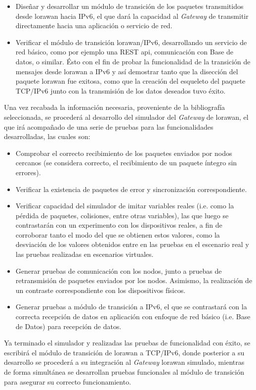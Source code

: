 \begin{justify}
\begin{itemize}
\item Diseñar y desarrollar un módulo de transición de los paquetes transmitidos desde \gls{lorawan} hacia IPv6, el que dará la capacidad al \textit{Gateway} de transmitir directamente hacia una aplicación o servicio de red.
\item Verificar el módulo de transición \gls{lorawan}/IPv6, desarrollando un servicio de red básico, como por ejemplo una REST \gls{api}, comunicación con Base de datos, o similar. Ésto con el fin de probar la funcionalidad de la transición de mensajes desde \gls{lorawan} a IPv6 y así demostrar tanto que la disección del paquete \gls{lorawan} fue exitosa, como que la creación del esqueleto del paquete TCP/IPv6 junto con la transmisión de los datos deseados tuvo éxito.
\end{itemize}

Una vez recabada la información necesaria, proveniente de la bibliografía seleccionada, se procederá al desarrollo del simulador del \textit{Gateway} de \gls{lorawan}, el que irá acompañado de una serie de pruebas para las funcionalidades desarrolladas, las cuales son:\\
\begin{itemize}
\item Comprobar el correcto recibimiento de los paquetes enviados por nodos cercanos (se considera correcto, el recibimiento de un paquete íntegro sin errores).
\item Verificar la existencia de paquetes de error y sincronización correspondiente.
\item Verificar capacidad del simulador de imitar variables reales (i.e. como la pérdida de paquetes, colisiones, entre otras variables), las que luego se contrastarán con un experimento con los dispositivos reales, a fin de corroborar tanto el modo del que se obtienen estos valores, como la desviación de los valores obtenidos entre en las pruebas en el escenario real y las pruebas realizadas en escenarios virtuales.
\item Generar pruebas de comunicación con los nodos, junto a pruebas de retransmisión de paquetes enviados por los nodos. Asimismo, la realización de un contraste correspondiente con los dispositivos físicos.
\item Generar pruebas a módulo de transición a IPv6, el que se contrastará con la correcta recepción de datos en aplicación con enfoque de red básico (i.e. Base de Datos) para recepción de datos.
\end{itemize}
Ya terminado el simulador y realizadas las pruebas de funcionalidad con éxito, se escribirá el módulo de transición de \gls{lorawan} a TCP/IPv6, donde posterior a su desarrollo se procederá a su integración al \textit{Gateway} \gls{lorawan} simulado, mientras de forma simultánea se desarrollan pruebas funcionales al módulo de transición para asegurar su correcto funcionamiento.
\end{justify}